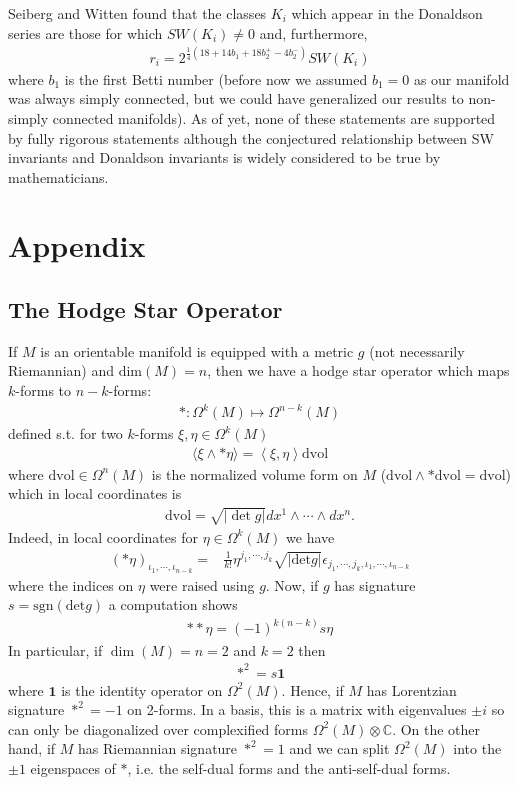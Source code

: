\documentclass[12pt, onecolumn]{article}
\begin{document}
Seiberg and Witten found that the classes $K_{i}$ which appear in the Donaldson series are those for which $SW(K_{i}) \neq 0$ and, furthermore,
\begin{align*}
r_{i}=2^{\frac{1}{4}\left(18+14b_{1}+18b_{2}^{+}-4b_{2}^{-}\right)}SW(K_{i})
\end{align*}
where $b_{1}$ is the first Betti number (before now we assumed $b_{1}=0$ as our manifold was always simply connected, but we could have generalized our results to non-simply connected manifolds).  As of yet, none of these statements are supported by fully rigorous statements although the conjectured relationship between SW invariants and Donaldson invariants is widely considered to be true by mathematicians.



\section{Appendix}
\subsection{The Hodge Star Operator}
If $M$ is an orientable manifold is equipped with a metric $g$ (not necessarily Riemannian) and $\text{dim}(M)=n$, then we have a hodge star operator which maps $k$-forms to $n-k$-forms:
\begin{align*}
*:\Omega^k(M) \mapsto \Omega^{n-k}(M)
\end{align*}
defined s.t. for two $k$-forms $\xi,\eta \in \Omega^{k}(M)$
\begin{align*}
\langle \xi \wedge * \eta \rangle = \left \langle \xi,\eta \right \rangle \text{dvol}
\end{align*}
where $\text{dvol} \in \Omega^{n}(M)$ is the normalized volume form on $M$ ($\text{dvol} \wedge * \text{dvol}= \text{dvol}$) which in local coordinates is
\begin{align*}
\text{dvol}=\sqrt{|\det g|} dx^{1} \wedge \cdots \wedge dx^{n}.
\end{align*}
Indeed, in local coordinates for $\eta \in \Omega^{k}(M)$ we have
\begin{align*}
(*\eta)_{\iota_{1},\cdots,\iota_{n-k}}=&\frac{1}{k!}\eta^{j_{1},\cdots,j_{k}}\sqrt{|\text{det}g|}\epsilon_{j_{1},\cdots,j_{k},\iota_{1},\cdots,\iota_{n-k}}
\end{align*}
where the indices on $\eta$ were raised using $g$.  Now, if $g$ has signature $s=\text{sgn}(\text{det} g)$ a computation shows
\begin{align*}
**\eta=(-1)^{k(n-k)}s\eta
\end{align*}
In particular, if $\dim(M)=n=2$ and $k=2$ then 
\begin{align*}
*^2=s \textbf{1}
\end{align*}
where $\textbf{1}$ is the identity operator on $\Omega^{2}(M)$.  Hence, if $M$ has Lorentzian signature $*^2=-1$ on 2-forms.  In a basis, this is a matrix with eigenvalues $\pm i$ so can only be diagonalized over complexified forms $\Omega^{2}(M) \otimes \mathbb{C}$.  On the other hand, if $M$ has Riemannian signature $*^2=1$ and we can split $\Omega^{2}(M)$ into the $\pm 1$ eigenspaces of $*$, i.e. the self-dual forms and the anti-self-dual forms.
\end{document}

